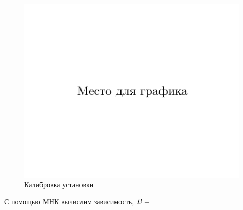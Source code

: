 \documentclass{physlab}
\begin{document}
\begin{figure}[b!]\centering
	\label{graph1}
	\includegraphics[width=.65\tw]{foo}
			\caption{Калибровка установки}
	\end {figure}
С помощью МНК вычислим зависимость, $B = \val$
\end{document}
